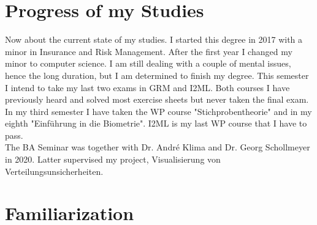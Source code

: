 \documentclass[12pt,a4paper]{article}
\begin{document}
\section*{Progress of my Studies}
	Now about the current state of my studies. I started this degree in	2017 with a minor in Insurance and Risk Management. After the first year I changed my minor to computer science. I am still dealing with a couple of mental issues, hence the long duration, but I am determined to finish my degree. This semester I intend to take my last two exams in GRM and I2ML. Both courses I have previously heard and solved most exercise sheets but never taken the final exam.\\
	In my third semester I have taken the WP course "Stichprobentheorie" and in my eighth "Einführung in die Biometrie". I2ML is my last WP course that I have to pass.\\
	The BA Seminar was together with Dr. André Klima and Dr. Georg Schollmeyer in 2020. Latter supervised my project, Visualisierung von Verteilungsunsicherheiten.
\section*{Familiarization}
	
\end{document}
